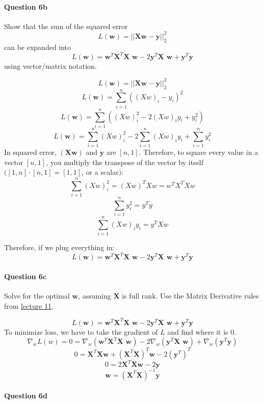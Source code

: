 \documentclass[11pt]{article}
\begin{document}
\paragraph{Question 6b}\label{question-6b}

Show that the sum of the squared error
\[L(\textbf{w}) = ||\textbf{Xw}-\textbf{y}||_2^2\] can be expanded into
\[L(\textbf{w}) = \textbf{w}^T \textbf{X}^T \textbf{X w} - 2 \textbf{y}^T \textbf{X w} + \textbf{y}^T \textbf{y}\]
using vector/matrix notation.

    \[L(\textbf{w}) = ||\textbf{Xw}-\textbf{y}||_2^2\]
\[L(\textbf{w}) = \sum^n_{i=1}((Xw)_i-y_i)^2\]
\[L(\textbf{w}) = \sum^n_{i=1}((Xw)_i^2-2(Xw)_iy_i+y_i^2)\]
\[L(\textbf{w}) = \sum^n_{i=1}(Xw)_i^2-2\sum^n_{i=1}(Xw)_iy_i+\sum^n_{i=1}y_i^2\]
In squared error, \((\textbf{Xw})\) and \(\textbf{y}\) are \([n,1]\).
Therefore, to square every value in a vector \([n,1]\), you multiply the
transpose of the vector by itself \(([1,n] \cdot [n,1] = [1, 1]\), or a
scalar\()\): \[\sum^n_{i=1}(Xw)_i^2 = (Xw)^TXw= w^TX^TXw\]
\[\sum^n_{i=1}y_i^2 = y^Ty\] \[\sum^n_{i=1}(Xw)_iy_i = y^TXw\]

Therefore, if we plug everything in:
\[L(\textbf{w}) = \textbf{w}^T \textbf{X}^T \textbf{X w} - 2 \textbf{y}^T \textbf{X w} + \textbf{y}^T \textbf{y}\]

    \paragraph{Question 6c}\label{question-6c}

Solve for the optimal \(\textbf{w}\), assuming \(\textbf{X}\) is full
rank. Use the Matrix Derivative rules from
\href{http://www.ds100.org/fa18/syllabus\#lecture-week-6}{lecture 11}.

    \[L(\textbf{w}) = \textbf{w}^T \textbf{X}^T \textbf{X w} - 2 \textbf{y}^T \textbf{X w} + \textbf{y}^T \textbf{y}\]
To minimize loss, we have to take the gradient of \(L\) and find where
it is \(0\).
\[\nabla_w L(w)=0=\nabla_w(\textbf{w}^T \textbf{X}^T \textbf{X w}) - 2\nabla_w(\textbf{y}^T \textbf{X w}) + \nabla_w(\textbf{y}^T \textbf{y})\]
\[0= \textbf{X}^T\textbf{Xw} + (\textbf{X}^T\textbf{X})^T\textbf{w} - 2(\textbf{y}^T)^T\]
\[0= 2\textbf{X}^T\textbf{Xw} - 2\textbf{y}\]
\[\textbf{w} = (\textbf{X}^T\textbf{X})^{-1}\textbf{y}\]

    \paragraph{Question 6d}\label{question-6d}
\end{document}
